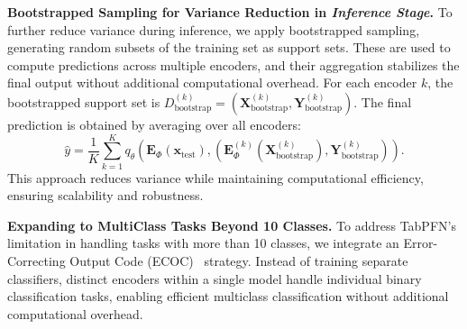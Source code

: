 \textbf{Bootstrapped Sampling for Variance Reduction in \textit{{\color{blue} Inference} Stage}.}  
To further reduce variance during inference, we apply bootstrapped sampling, generating random subsets of the training set as support sets. These are used to compute predictions across multiple encoders, and their aggregation stabilizes the final output without additional computational overhead.
For each encoder \( k \), the bootstrapped support set is
\(
D_{\text{bootstrap}}^{(k)} = (\boldsymbol{X}_{\text{bootstrap}}^{(k)}, \boldsymbol{Y}_{\text{bootstrap}}^{(k)}).
\)
The final prediction is obtained by averaging over all encoders:
\begin{equation}
\hat{y} = \frac{1}{K} \sum_{k=1}^{K} q_{\theta}\left(\boldsymbol{E}_\Phi(\boldsymbol{x}_{\text{test}}), \left( \boldsymbol{E}_\Phi^{(k)}(\boldsymbol{X}_{\text{bootstrap}}^{(k)}), \boldsymbol{Y}_{\text{bootstrap}}^{(k)} \right) \right).
\end{equation}  
This approach reduces variance while maintaining computational efficiency, ensuring scalability and robustness.

\textbf{Expanding to MultiClass Tasks Beyond 10 Classes.}  
To address TabPFN’s limitation in handling tasks with more than 10 classes, we integrate an Error-Correcting Output Code (ECOC)~\cite{DietterichB95ECOC} strategy. Instead of training separate classifiers, distinct encoders within a single model handle individual binary classification tasks, enabling efficient multiclass classification without additional computational overhead.

